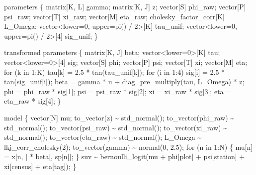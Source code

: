 \documentclass[
  12pt,
  letterpaper,
  DIV=11,
  numbers=noendperiod]{scrartcl}
\newenvironment{Shaded}{\begin{snugshade}}{\end{snugshade}}
\newcommand{\ControlFlowTok}[1]{\textcolor[rgb]{0.00,0.23,0.31}{#1}}
\newcommand{\DataTypeTok}[1]{\textcolor[rgb]{0.68,0.00,0.00}{#1}}
\newcommand{\DecValTok}[1]{\textcolor[rgb]{0.68,0.00,0.00}{#1}}
\newcommand{\FloatTok}[1]{\textcolor[rgb]{0.68,0.00,0.00}{#1}}
\newcommand{\KeywordTok}[1]{\textcolor[rgb]{0.00,0.23,0.31}{#1}}
\newcommand{\NormalTok}[1]{\textcolor[rgb]{0.00,0.23,0.31}{#1}}
\begin{document}
\begin{Shaded}
\begin{Highlighting}[]
\KeywordTok{parameters}\NormalTok{ \{}
  \DataTypeTok{matrix}\NormalTok{[K, L] gamma;}
  \DataTypeTok{matrix}\NormalTok{[K, J] z;}
  \DataTypeTok{vector}\NormalTok{[S] phi\_raw;}
  \DataTypeTok{vector}\NormalTok{[P] psi\_raw;}
  \DataTypeTok{vector}\NormalTok{[T] xi\_raw;}
  \DataTypeTok{vector}\NormalTok{[M] eta\_raw;}
  \DataTypeTok{cholesky\_factor\_corr}\NormalTok{[K] L\_Omega;}
  \DataTypeTok{vector}\NormalTok{\textless{}}\KeywordTok{lower}\NormalTok{=}\DecValTok{0}\NormalTok{, }\KeywordTok{upper}\NormalTok{=pi() / }\DecValTok{2}\NormalTok{\textgreater{}[K] tau\_unif;}
  \DataTypeTok{vector}\NormalTok{\textless{}}\KeywordTok{lower}\NormalTok{=}\DecValTok{0}\NormalTok{, }\KeywordTok{upper}\NormalTok{=pi() / }\DecValTok{2}\NormalTok{\textgreater{}[}\DecValTok{4}\NormalTok{] sig\_unif;}
\NormalTok{\}}

\KeywordTok{transformed parameters}\NormalTok{ \{}
  \DataTypeTok{matrix}\NormalTok{[K, J] beta;}
  \DataTypeTok{vector}\NormalTok{\textless{}}\KeywordTok{lower}\NormalTok{=}\DecValTok{0}\NormalTok{\textgreater{}[K] tau;}
  \DataTypeTok{vector}\NormalTok{\textless{}}\KeywordTok{lower}\NormalTok{=}\DecValTok{0}\NormalTok{\textgreater{}[}\DecValTok{4}\NormalTok{] sig;}
  \DataTypeTok{vector}\NormalTok{[S] phi;}
  \DataTypeTok{vector}\NormalTok{[P] psi;}
  \DataTypeTok{vector}\NormalTok{[T] xi;}
  \DataTypeTok{vector}\NormalTok{[M] eta;}
  \ControlFlowTok{for}\NormalTok{ (k }\ControlFlowTok{in} \DecValTok{1}\NormalTok{:K) tau[k] = }\FloatTok{2.5}\NormalTok{ * tan(tau\_unif[k]);}
  \ControlFlowTok{for}\NormalTok{ (i }\ControlFlowTok{in} \DecValTok{1}\NormalTok{:}\DecValTok{4}\NormalTok{) sig[i] = }\FloatTok{2.5}\NormalTok{ * tan(sig\_unif[i]);}
\NormalTok{  beta = gamma * u + diag\_pre\_multiply(tau, L\_Omega) * z;}
\NormalTok{  phi = phi\_raw * sig[}\DecValTok{1}\NormalTok{];}
\NormalTok{  psi = psi\_raw * sig[}\DecValTok{2}\NormalTok{];}
\NormalTok{  xi = xi\_raw * sig[}\DecValTok{3}\NormalTok{];}
\NormalTok{  eta = eta\_raw * sig[}\DecValTok{4}\NormalTok{];}
\NormalTok{\}}

\KeywordTok{model}\NormalTok{ \{}
  \DataTypeTok{vector}\NormalTok{[N] mu;}
\NormalTok{  to\_vector(z) \textasciitilde{} std\_normal();}
\NormalTok{  to\_vector(phi\_raw) \textasciitilde{} std\_normal();}
\NormalTok{  to\_vector(psi\_raw) \textasciitilde{} std\_normal();}
\NormalTok{  to\_vector(xi\_raw) \textasciitilde{} std\_normal();}
\NormalTok{  to\_vector(eta\_raw) \textasciitilde{} std\_normal();}
\NormalTok{  L\_Omega \textasciitilde{} lkj\_corr\_cholesky(}\DecValTok{2}\NormalTok{);}
\NormalTok{  to\_vector(gamma) \textasciitilde{} normal(}\DecValTok{0}\NormalTok{, }\FloatTok{2.5}\NormalTok{);}
  \ControlFlowTok{for}\NormalTok{ (n }\ControlFlowTok{in} \DecValTok{1}\NormalTok{:N) \{}
\NormalTok{    mu[n] = x[n, ] * beta[, sp[n]];}
\NormalTok{  \}}
\NormalTok{  suv \textasciitilde{} bernoulli\_logit(mu + phi[plot] + psi[station] + xi[census] + eta[tag]);}
\NormalTok{\}}


\end{Highlighting}
\end{Shaded}
\end{document}
